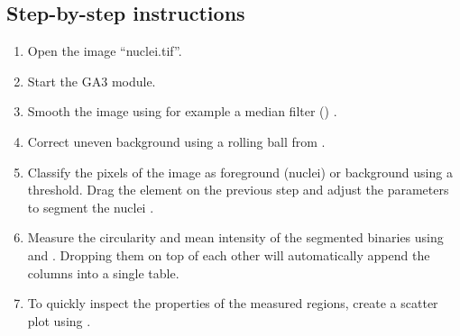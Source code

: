 \subsection{Step-by-step instructions}
\begin{enumerate}
    \item Open the image ``nuclei.tif''.
    \item Start the GA3 module.
    \item Smooth the image using for example a median filter () .
    \item Correct uneven background using a rolling ball from  .
    \item Classify the pixels of the image as foreground (nuclei) or background using a threshold. Drag the element  on the previous step and adjust the parameters to segment the nuclei .
    \item Measure the circularity and mean intensity of the segmented binaries using  and  . Dropping them on top of each other will automatically append the columns into a single table.
    \item To quickly inspect the properties of the measured regions, create a scatter plot using .
\end{enumerate}

